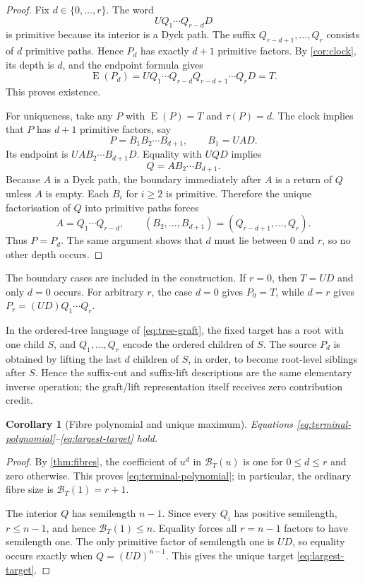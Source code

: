 \documentclass[10pt,a4paper]{amsart}
\newtheorem{corollary}[theorem]{Corollary}
\theoremstyle{definition}
\theoremstyle{remark}
\newcommand{\End}{\operatorname E}
\newcommand{\Fib}{\mathcal B}
\begin{document}
\begin{proof}
Fix $d\in\{0,\ldots,r\}$.  The word
\[
                         UQ_1\cdots Q_{r-d}D
\]
is primitive because its interior is a Dyck path.  The suffix
$Q_{r-d+1},\ldots,Q_r$ consists of $d$ primitive paths.  Hence $P_d$ has
exactly $d+1$ primitive factors.  By \cref{cor:clock}, its depth is $d$, and
the endpoint formula gives
\[
 \End(P_d)=UQ_1\cdots Q_{r-d}Q_{r-d+1}\cdots Q_rD=T.
\]
This proves existence.

For uniqueness, take any $P$ with $\End(P)=T$ and $\tau(P)=d$.  The clock
implies that $P$ has $d+1$ primitive factors, say
\[
                         P=B_1B_2\cdots B_{d+1},
                         \qquad B_1=UAD.
\]
Its endpoint is $UA B_2\cdots B_{d+1}D$.  Equality with $UQD$ implies
\begin{equation}\label{eq:interior-split}
                         Q=A B_2\cdots B_{d+1}.
\end{equation}
Because $A$ is a Dyck path, the boundary immediately after $A$ is a return of
$Q$ unless $A$ is empty.  Each $B_i$ for $i\geq2$ is primitive.  Therefore
the unique factorisation of $Q$ into primitive paths forces
\[
 A=Q_1\cdots Q_{r-d},\qquad
 (B_2,\ldots,B_{d+1})=(Q_{r-d+1},\ldots,Q_r).
\]
Thus $P=P_d$.  The same argument shows that $d$ must lie between $0$ and $r$,
so no other depth occurs.
\end{proof}

The boundary cases are included in the construction.  If $r=0$, then $T=UD$
and only $d=0$ occurs.  For arbitrary $r$, the case $d=0$ gives $P_0=T$,
while $d=r$ gives $P_r=(UD)Q_1\cdots Q_r$.

In the ordered-tree language of \eqref{eq:tree-graft}, the fixed target has a
root with one child $S$, and $Q_1,\ldots,Q_r$ encode the ordered children of
$S$.  The source $P_d$ is obtained by lifting the last $d$ children of $S$,
in order, to become root-level siblings after $S$.  Hence the suffix-cut and
suffix-lift descriptions are the same elementary inverse operation; the
graft/lift representation itself receives zero contribution credit.

\begin{corollary}[Fibre polynomial and unique maximum]\label{cor:max-fibre}
Equations \eqref{eq:terminal-polynomial}--\eqref{eq:largest-target} hold.
\end{corollary}

\begin{proof}
By \cref{thm:fibres}, the coefficient of $u^d$ in $\Fib_T(u)$ is one for
$0\leq d\leq r$ and zero otherwise.  This proves
\eqref{eq:terminal-polynomial}; in particular, the ordinary fibre size is
$\Fib_T(1)=r+1$.

The interior $Q$ has semilength $n-1$.  Since every $Q_i$ has positive
semilength, $r\leq n-1$, and hence $\Fib_T(1)\leq n$.  Equality forces all
$r=n-1$ factors to have semilength one.  The only primitive factor of
semilength one is $UD$, so equality occurs exactly when
$Q=(UD)^{n-1}$.  This gives the unique target \eqref{eq:largest-target}.
\end{proof}
\end{document}
